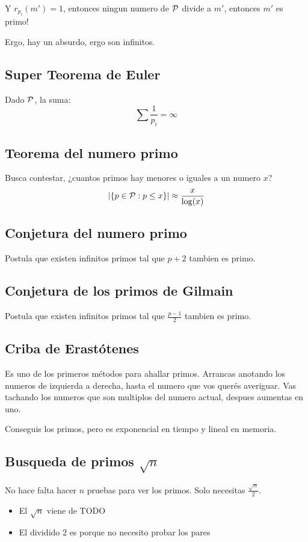 \documentclass[12pt,a4paper]{report}
\begin{document}
Y $r_{p_i}(m') = 1$, entonces ningun numero de $\mathcal{{P}}$ divide a $m'$, entonces $m'$ es primo!

Ergo, hay un absurdo, ergo son infinitos.

\subsection{Super Teorema de Euler}
Dado $\mathcal{{P}}$, la suma:
$$
\sum \frac{1}{p_i} = \infty
$$
\subsection{Teorema del numero primo}
Busca contestar, ¿cuantos primos hay menores o iguales a un numero $x$?
$$
| \{p \in \mathcal{{P}} : p \leq x \} | \approx \frac{x}{\log(x)}
$$

\subsection{Conjetura del numero primo}
Postula que existen infinitos primos tal que $p + 2$ tambien es primo.

\subsection{Conjetura de los primos de Gilmain}
Postula que existen infinitos primos tal que $\frac{p - 1}{2}$ tambien es primo.

\subsection{Criba de Erastótenes}
Es uno de los primeros métodos para ahallar primos.
Arrancas anotando los numeros de izquierda a derecha, hasta el numero que vos querés averiguar. Vas tachando los numeros que son multiplos del numero actual, despues aumentas en uno.

Conseguis los primos, pero es exponencial en tiempo y lineal en memoria.

\subsection{Busqueda de primos $\sqrt{n}$}

No hace falta hacer $n$ pruebas para ver los primos. Solo necesitas $\frac{\sqrt{n}}{2}$.

\begin{itemize}
  \item{El $\sqrt{n}$ viene de TODO}
  \item{El dividido $2$ es porque no necesito probar los pares}
\end{itemize}
\end{document}
